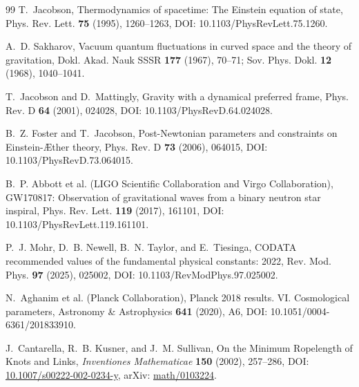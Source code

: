 \documentclass[11pt]{article}
\theoremstyle{definition}
\theoremstyle{plain}
\theoremstyle{remark}
\begin{document}
\begin{thebibliography}{99}
            T.~Jacobson,
            \newblock Thermodynamics of spacetime: The Einstein equation of state,
            \newblock Phys. Rev. Lett. \textbf{75} (1995), 1260--1263,
            \newblock DOI: 10.1103/PhysRevLett.75.1260.

            A.~D. Sakharov,
            \newblock Vacuum quantum fluctuations in curved space and the theory of gravitation,
            \newblock Dokl. Akad. Nauk SSSR \textbf{177} (1967), 70--71;
            \newblock Sov. Phys. Dokl. \textbf{12} (1968), 1040--1041.

            T.~Jacobson and D.~Mattingly,
            \newblock Gravity with a dynamical preferred frame,
            \newblock Phys. Rev. D \textbf{64} (2001), 024028,
            \newblock DOI: 10.1103/PhysRevD.64.024028.

            B.~Z. Foster and T.~Jacobson,
            \newblock Post-Newtonian parameters and constraints on Einstein-\AE ther theory,
            \newblock Phys. Rev. D \textbf{73} (2006), 064015,
            \newblock DOI: 10.1103/PhysRevD.73.064015.

            B.~P. Abbott et al. (LIGO Scientific Collaboration and Virgo Collaboration),
            \newblock GW170817: Observation of gravitational waves from a binary neutron star inspiral,
            \newblock Phys. Rev. Lett. \textbf{119} (2017), 161101,
            \newblock DOI: 10.1103/PhysRevLett.119.161101.

            P.~J. Mohr, D.~B. Newell, B.~N. Taylor, and E.~Tiesinga,
            \newblock CODATA recommended values of the fundamental physical constants: 2022,
            \newblock Rev. Mod. Phys. \textbf{97} (2025), 025002,
            \newblock DOI: 10.1103/RevModPhys.97.025002.

            N.~Aghanim et al. (Planck Collaboration),
            \newblock Planck 2018 results. VI. Cosmological parameters,
            \newblock Astronomy \& Astrophysics \textbf{641} (2020), A6,
            \newblock DOI: 10.1051/0004-6361/201833910.

            J.~Cantarella, R.~B. Kusner, and J.~M. Sullivan,
            \newblock On the Minimum Ropelength of Knots and Links,
            \newblock \emph{Inventiones Mathematicae} \textbf{150} (2002), 257--286,
            \newblock DOI: \href{https://doi.org/10.1007/s00222-002-0234-y}{10.1007/s00222-002-0234-y},
            \newblock arXiv: \href{https://arxiv.org/abs/math/0103224}{math/0103224}.


\end{thebibliography}
\end{document}
